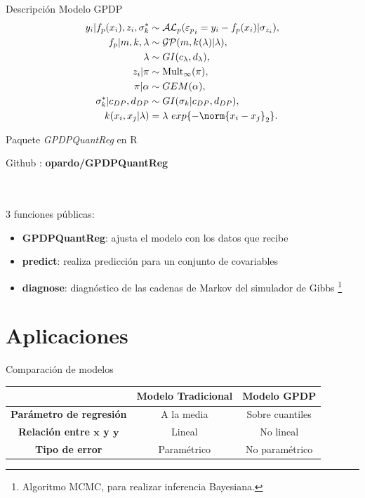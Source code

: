\documentclass{beamer}
\begin{document}
\begin{frame}{Descripci\'on Modelo GPDP}
    \begin{equation*}
    \begin{aligned}
        y_i| f_p(x_i), z_i, \sigma_k^* &\sim \mathcal{AL}_p({\varepsilon_p}_i = y_i - f_p(x_i) | \sigma_{z_i}), \\
        f_p|m, k, \lambda &\sim \mathcal{GP}(m,k(\lambda)|\lambda), \\
        \lambda &\sim GI(c_\lambda,d_\lambda), \\
        z_i | \pi &\sim \mathrm{Mult}_{\infty}(\pi), \\
        \pi | \alpha &\sim GEM(\alpha), \\
        \sigma_k^* | c_{DP}, d_{DP} &\sim GI(\sigma_k|c_{DP}, d_{DP}),\\
        k(x_i, x_j | \lambda) &= \lambda \text{ } exp\{-\norm{x_i - x_j}_2\}.
    \end{aligned}
    \end{equation*}
\end{frame}

\begin{frame}{Paquete \textit{GPDPQuantReg} en R}
    \begin{Large} Github \faGithub \space: \textbf{opardo/GPDPQuantReg} \end{Large}
    \\~\\
    3 funciones p\'ublicas:
    \begin{itemize}
        \item \textbf{GPDPQuantReg}: ajusta el modelo con los datos que recibe
        \item \textbf{predict}: realiza predicci\'on para un conjunto de covariables
        \item \textbf{diagnose}: diagn\'ostico de las cadenas de Markov del simulador de Gibbs \footnote{Algoritmo MCMC, para realizar inferencia Bayesiana.}
    \end{itemize}{}
\end{frame}

\section{Aplicaciones}

\begin{frame}{Comparaci\'on de modelos}
    \begin{table}[H]
    \centering
    \begin{tabular}{ccc}
    \hline
     & \textbf{Modelo Tradicional} & \textbf{Modelo GPDP} \\ 
    \hline
    \textbf{Par\'ametro de regresi\'on} & A la media & Sobre cuantiles \\ 
    \textbf{Relaci\'on entre $\bm x$ y $ \bm y$} & Lineal & No lineal \\ 
    \textbf{Tipo de error} & Param\'etrico & No param\'etrico \\ 
    \hline
    \end{tabular}
\end{table}
\end{frame}
\end{document}
